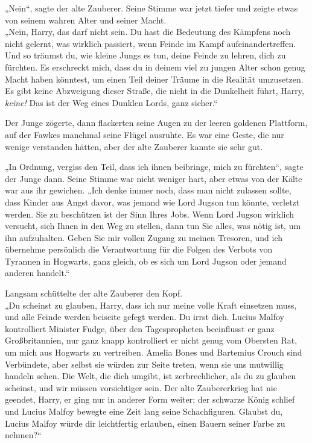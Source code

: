 {„Nein“, sagte der alte Zauberer. Seine Stimme war jetzt tiefer und zeigte etwas von seinem wahren Alter und seiner Macht.\\ „Nein, Harry, das darf nicht sein. Du hast die Bedeutung des Kämpfens noch nicht gelernt, was wirklich passiert, wenn Feinde im Kampf aufeinandertreffen. Und so träumst du, wie kleine Jungs es tun, deine Feinde zu lehren, dich zu fürchten. Es erschreckt mich, dass du in deinem viel zu jungen Alter schon genug Macht haben könntest, um einen Teil deiner Träume in die Realität umzusetzen. Es gibt keine Abzweigung dieser Straße, die nicht in die Dunkelheit führt, Harry, \emph{keine!} Das ist der Weg eines Dunklen Lords, ganz sicher.“

Der Junge zögerte, dann flackerten seine Augen zu der leeren goldenen Plattform, auf der Fawkes manchmal seine Flügel ausruhte. Es war eine Geste, die nur wenige verstanden hätten, aber der alte Zauberer kannte sie sehr gut.

„In Ordnung, vergiss den Teil, dass ich ihnen beibringe, mich zu fürchten“, sagte der Junge dann. Seine Stimme war nicht weniger hart, aber etwas von der Kälte war aus ihr gewichen. „Ich denke immer noch, dass man nicht zulassen sollte, dass Kinder aus Angst davor, was jemand wie Lord Jugson tun könnte, verletzt werden. Sie zu beschützen ist der Sinn Ihres Jobs. Wenn Lord Jugson wirklich versucht, sich Ihnen in den Weg zu stellen, dann tun Sie alles, was nötig ist, um ihn aufzuhalten. Geben Sie mir vollen Zugang zu meinen Tresoren, und ich übernehme persönlich die Verantwortung für die Folgen des Verbots von Tyrannen in Hogwarts, ganz gleich, ob es sich um Lord Jugson oder jemand anderen handelt.“

Langsam schüttelte der alte Zauberer den Kopf.\\ „Du scheinst zu glauben, Harry, dass ich nur meine volle Kraft einsetzen muss, und alle Feinde werden beiseite gefegt werden. Du irrst dich. Lucius Malfoy kontrolliert Minister Fudge, über den Tagespropheten beeinflusst er ganz Großbritannien, nur ganz knapp kontrolliert er nicht genug vom Obersten Rat, um mich aus Hogwarts zu vertreiben. Amelia Bones und Bartemius Crouch sind Verbündete, aber selbst sie würden zur Seite treten, wenn sie uns mutwillig handeln sehen. Die Welt, die dich umgibt, ist zerbrechlicher, als du zu glauben scheinst, und wir müssen vorsichtiger sein. Der alte Zaubererkrieg hat nie geendet, Harry, er ging nur in anderer Form weiter; der schwarze König schlief und Lucius Malfoy bewegte eine Zeit lang seine Schachfiguren. Glaubst du, Lucius Malfoy würde dir leichtfertig erlauben, einen Bauern seiner Farbe zu nehmen?“

}
